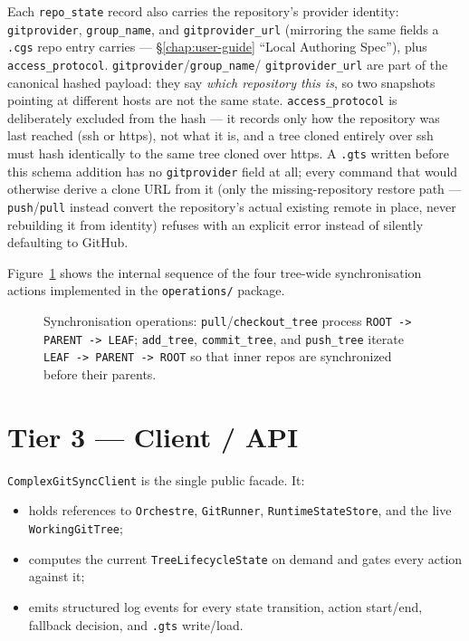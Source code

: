 Each \texttt{repo\_state} record also carries the repository's provider
identity: \texttt{gitprovider}, \texttt{group\_name}, and
\texttt{gitprovider\_url} (mirroring the same fields a \texttt{.cgs} repo
entry carries — \S\ref{chap:user-guide} ``Local Authoring Spec''), plus
\texttt{access\_protocol}. \texttt{gitprovider}/\texttt{group\_name}/
\texttt{gitprovider\_url} are part of the canonical hashed payload:
they say \emph{which repository this is}, so two snapshots pointing at
different hosts are not the same state. \texttt{access\_protocol} is
deliberately excluded from the hash — it records only how the repository
was last reached (ssh or https), not what it is, and a tree cloned entirely
over ssh must hash identically to the same tree cloned over https. A
\texttt{.gts} written before this schema addition has no
\texttt{gitprovider} field at all; every command that would otherwise
derive a clone URL from it (only the missing-repository restore path —
\texttt{push}/\texttt{pull} instead convert the repository's actual
existing remote in place, never rebuilding it from identity) refuses with
an explicit error instead of silently defaulting to GitHub.

Figure~\ref{fig:ops-sequence} shows the internal sequence of the four
tree-wide synchronisation actions implemented in the \texttt{operations/} package.

\begin{figure}[ht]
\centering
\caption{Synchronisation operations: \texttt{pull}/\texttt{checkout\_tree}
  process \texttt{ROOT -> PARENT -> LEAF}; \texttt{add\_tree},
  \texttt{commit\_tree}, and \texttt{push\_tree} iterate
  \texttt{LEAF -> PARENT -> ROOT} so that inner repos are synchronized before
  their parents.}
\label{fig:ops-sequence}

\end{figure}

\section{Tier 3 — Client / API}
\label{sec:tier-client}

\texttt{ComplexGitSyncClient} is the single public facade.  It:

\begin{itemize}
  \item holds references to \texttt{Orchestre}, \texttt{GitRunner},
    \texttt{RuntimeStateStore}, and the live \texttt{WorkingGitTree};
  \item computes the current \texttt{TreeLifecycleState} on demand and gates
    every action against it;
  \item emits structured log events for every state transition, action start/end,
    fallback decision, and \texttt{.gts} write/load.
\end{itemize}

